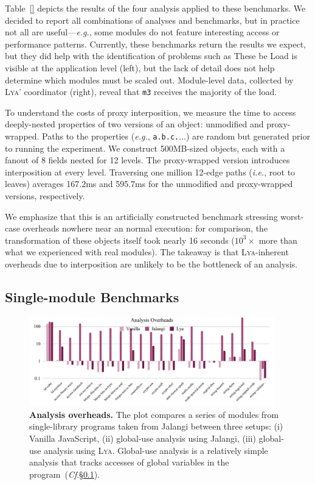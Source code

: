 \documentclass[letterpaper,twocolumn,10pt]{article}
\def\eg{{\em e.g.}, }
\def\ie{{\em i.e.}, }
\newcommand{\ttt}[1]{\texttt{#1}}
\newcommand{\cf}[1]{(\emph{Cf}.\S\ref{#1})}
\newcommand{\sys}{{\scshape Lya}\xspace}
\begin{document}
Table~\ref{} depicts the results of the four analysis applied to these benchmarks.
We decided to report all combinations of analyses and benchmarks, but in practice not all are useful---\eg some modules do not feature interesting access or performance patterns.
Currently, these benchmarks return the results we expect, but they did help with the identification of problems such as 
These be
Load is visible at the application level (left), but the lack of detail does not help determine which modules must be scaled out.
Module-level data, collected by \sys' coordinator (right), reveal that \ttt{m3} receives the majority of the load.

To understand the costs of proxy interposition, we measure the time to access deeply-nested properties of two versions of an object:
  unmodified and proxy-wrapped.
Paths to the properties (\eg \ttt{a.b.c.$\ldots$}) are random but generated prior to running the experiment.
We construct 500MB-sized objects, each with a fanout of 8 fields nested for 12 levels.
The proxy-wrapped version introduces interposition at every level.
Traversing one million 12-edge paths (\ie root to leaves) averages 167.2ms and 595.7ms for the unmodified and proxy-wrapped versions, respectively.

We emphasize that this is an artificially constructed benchmark stressing worst-case overheads nowhere near an normal execution:
  for comparison, the transformation of these objects itself took nearly 16 seconds ($10^3\times$ more than what we experienced with real modules).
The takeaway is that \sys-inherent overheads due to interposition are unlikely to be the bottleneck of an analysis.

\subsection{Single-module Benchmarks}
\label{meso}

\begin{figure}[t]
  \centering
   \includegraphics[width=0.95\textwidth]{./figs/meso.pdf}
  \caption{
    \textbf{Analysis overheads.}
    The plot compares a series of modules from single-library programs taken from Jalangi between three setups:
		(i) Vanilla JavaScript, (ii) global-use analysis using Jalangi, (iii) global-use analysis using \sys.
    Global-use analysis is a relatively simple analysis that tracks accesses of global variables in the program~\cf{meso}.
  }
  \label{fig:meso}
  \vspace{-3mm}
\end{figure}
\end{document}
